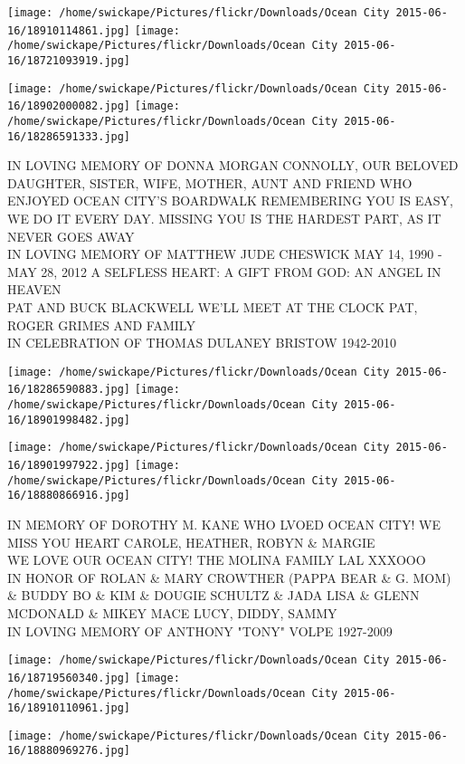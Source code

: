 \documentclass[10pt,letterpaper]{article}
\begin{document}
\texttt{[image: /home/swickape/Pictures/flickr/Downloads/Ocean City 2015-06-16/18910114861.jpg]}
\texttt{[image: /home/swickape/Pictures/flickr/Downloads/Ocean City 2015-06-16/18721093919.jpg]}

\texttt{[image: /home/swickape/Pictures/flickr/Downloads/Ocean City 2015-06-16/18902000082.jpg]}
\texttt{[image: /home/swickape/Pictures/flickr/Downloads/Ocean City 2015-06-16/18286591333.jpg]}

IN LOVING MEMORY OF DONNA MORGAN CONNOLLY, OUR BELOVED DAUGHTER, SISTER, WIFE, MOTHER, AUNT AND FRIEND WHO ENJOYED OCEAN CITY'S BOARDWALK REMEMBERING YOU IS EASY, WE DO IT EVERY DAY.  MISSING YOU IS THE HARDEST PART, AS IT NEVER GOES AWAY\\
IN LOVING MEMORY OF MATTHEW JUDE CHESWICK MAY 14, 1990 {-} MAY 28, 2012 A SELFLESS HEART: A GIFT FROM GOD: AN ANGEL IN HEAVEN\\
PAT AND BUCK BLACKWELL WE'LL MEET AT THE CLOCK PAT, ROGER GRIMES AND FAMILY\\
IN CELEBRATION OF THOMAS DULANEY BRISTOW 1942{-}2010
\pagebreak

\texttt{[image: /home/swickape/Pictures/flickr/Downloads/Ocean City 2015-06-16/18286590883.jpg]}
\texttt{[image: /home/swickape/Pictures/flickr/Downloads/Ocean City 2015-06-16/18901998482.jpg]}

\texttt{[image: /home/swickape/Pictures/flickr/Downloads/Ocean City 2015-06-16/18901997922.jpg]}
\texttt{[image: /home/swickape/Pictures/flickr/Downloads/Ocean City 2015-06-16/18880866916.jpg]}

IN MEMORY OF DOROTHY M. KANE WHO LVOED OCEAN CITY!  WE MISS YOU HEART CAROLE, HEATHER, ROBYN \& MARGIE\\
WE LOVE OUR OCEAN CITY! THE MOLINA FAMILY LAL XXXOOO\\
IN HONOR OF ROLAN \& MARY CROWTHER (PAPPA BEAR \& G. MOM) \& BUDDY BO \& KIM \& DOUGIE SCHULTZ \& JADA LISA \& GLENN MCDONALD \& MIKEY MACE LUCY, DIDDY, SAMMY\\
IN LOVING MEMORY OF ANTHONY "TONY" VOLPE 1927{-}2009
\pagebreak

\texttt{[image: /home/swickape/Pictures/flickr/Downloads/Ocean City 2015-06-16/18719560340.jpg]}
\texttt{[image: /home/swickape/Pictures/flickr/Downloads/Ocean City 2015-06-16/18910110961.jpg]}

\vspace{0.25in}
\texttt{[image: /home/swickape/Pictures/flickr/Downloads/Ocean City 2015-06-16/18880969276.jpg]}
\end{document}
